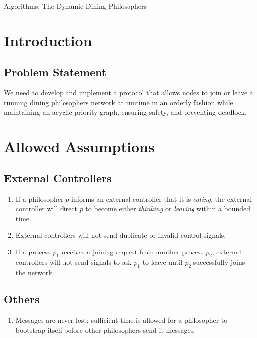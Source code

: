 \documentclass[11pt]{article}
\begin{document}
\pagestyle{fancy}


\begin{center} \Large Algorithms: The Dynamic Dining Philosophers \end{center}

\section{Introduction}


\subsection{Problem Statement}
We need to develop and implement a protocol that allows nodes to join or leave a running dining philosophers network at runtime in an orderly fashion while maintaining an acyclic priority graph, ensuring safety, and preventing deadlock.



\section{Allowed Assumptions}

\subsection{External Controllers}
\begin{enumerate}[E1]
\item If a philosopher $p$ informs an external controller that it is \emph{eating}, the external controller will direct $p$ to become either \emph{thinking} or \emph{leaving} within a bounded time.

\item External controllers will not send duplicate or invalid control signals.

\item \label{Assump:E_guarantees_nodes_entering_network} If a process $p_1$ receives a joining request from another process $p_2$, external controllers will not send signals to ask $p_1$ to leave until $p_2$ successfully joins the network.
\end{enumerate}

\subsection{Others}
\begin{enumerate}
\item Messages are never lost; sufficient time is allowed for a philosopher to bootstrap itself before other philosophers send it messages.
\end{enumerate}
\end{document}
